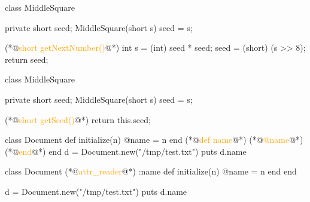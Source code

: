 \documentclass{article}
\begin{document}
\begin{lnSnippet}
class MiddleSquare {
  private short seed;
  MiddleSquare(short s) { seed = s; }

  (*@\textcolor{orange}{short getNextNumber()}@*) {
    int s = (int) seed * seed;
    seed = (short) (s >> 8);
    return seed;
  }
}
\end{lnSnippet}
\begin{lnSnippet}
class MiddleSquare {
  private short seed;
  MiddleSquare(short s) { seed = s; }

  (*@\textcolor{orange}{short getSeed()}@*) {
    return this.seed;
  }
}
\end{lnSnippet}

\begin{lnSnippet}
class Document
  def initialize(n)
    @name = n
  end
  (*@\textcolor{orange}{def name}@*)
    (*@\textcolor{orange}{@name}@*)
  (*@\textcolor{orange}{end}@*)
end
d = Document.new("/tmp/test.txt")
puts d.name
\end{lnSnippet}
\begin{lnSnippet}
class Document
  (*@\textcolor{orange}{attr\_reader}@*) :name
  def initialize(n)
    @name = n
  end
end

d = Document.new("/tmp/test.txt")
puts d.name
\end{lnSnippet}

\end{document}
